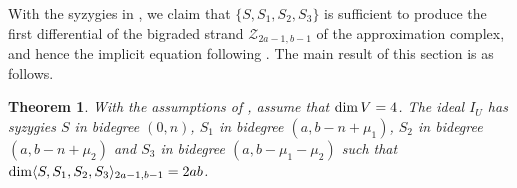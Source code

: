 \documentclass[reqno]{amsart}
\newtheorem{thm}{Theorem}[section]
\numberwithin{equation}{section}
\theoremstyle{definition}
\def\Z{\mathcal{Z}}
\def\dim{\mathop{\rm dim}}
\begin{document}
With the syzygies in , we claim that $\{S,S_1,S_2,S_3\}$ is sufficient to produce the first differential of the bigraded strand $\Z_{2a-1,b-1}$ of the approximation complex, and hence the implicit equation following . The main result of this section is as follows.




\begin{thm}\label{dim V = 4 - main theorem}
With the assumptions of , assume that $\dim V=4$. The ideal $I_U$ has syzygies $S$ in bidegree $(0,n)$, $S_1$ in bidegree $(a,b-n+\mu_1)$, $S_2$ in bidegree $(a,b-n+\mu_2)$ and $S_3$ in bidegree $(a,b-\mu_1-\mu_2)$ such that $\dim \langle S,S_1,S_2,S_3\rangle_{2a-1,b-1} = 2ab$. 
\end{thm}
\end{document}
